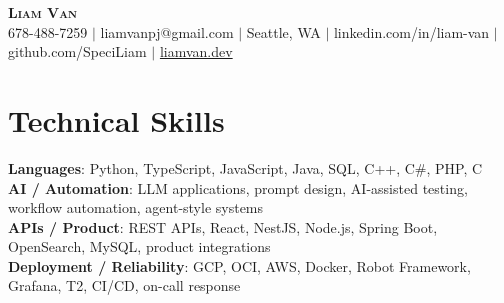 \documentclass[letterpaper,11pt]{article}
\begin{document}

%
\begin{center}
    \textbf{\Huge \scshape Liam Van} \\ \vspace{1pt}
    \small 678-488-7259 $|$ \small {liamvanpj@gmail.com} $|$ Seattle, WA
 {{$|$ linkedin.com/in/liam-van} {$|$ github.com/SpeciLiam} {$|$ \href{https://liamvan.dev}{liamvan.dev}}}

\end{center}

\section{Technical Skills}
 \begin{itemize}[leftmargin=0.15in, label={}]
    \small{\item{
     \textbf{Languages}{: Python, TypeScript, JavaScript, Java, SQL, C++, C\#, PHP, C} \\
     \textbf{AI / Automation}{: LLM applications, prompt design, AI-assisted testing, workflow automation, agent-style systems} \\
     \textbf{APIs / Product}{: REST APIs, React, NestJS, Node.js, Spring Boot, OpenSearch, MySQL, product integrations} \\
     \textbf{Deployment / Reliability}{: GCP, OCI, AWS, Docker, Robot Framework, Grafana, T2, CI/CD, on-call response} \\
    }}
 \end{itemize}
%

\end{document}
